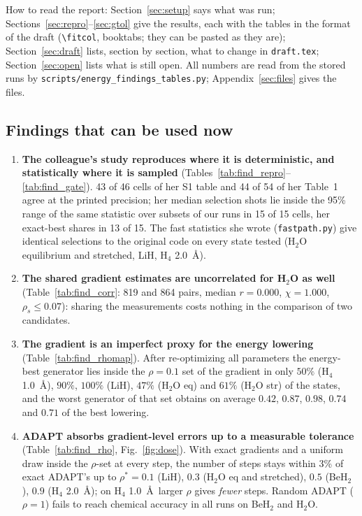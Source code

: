 \documentclass[11pt]{article}
\newcommand{\fitcol}[1]{\sbox{\fitbox}{#1}\ifdim\wd\fitbox>\columnwidth\resizebox{\columnwidth}{!}{\usebox{\fitbox}}\else\usebox{\fitbox}\fi}
\begin{document}
How to read the report: Section~\ref{sec:setup} says what was run; Sections~\ref{sec:repro}--\ref{sec:gtol} give the results, each with the tables in the format of the draft
(\verb|\fitcol|, booktabs; they can be pasted as they are); Section~\ref{sec:draft} lists, section by section, what to change in \texttt{draft.tex}; Section~\ref{sec:open} lists what is
still open. All numbers are read from the stored runs by \texttt{scripts/energy\_findings\_tables.py}; Appendix~\ref{sec:files} gives the files.

\subsection{Findings that can be used now}
\begin{enumerate}
  \item \textbf{The colleague's study reproduces where it is deterministic, and statistically where it is sampled} (Tables~\ref{tab:find_repro}--\ref{tab:find_gate}). 43 of 46 cells of her S1 table and 44 of 54 of her Table~1 agree at the printed precision;
        her median selection shots lie inside the 95\% range of the same statistic over subsets of our runs in 15 of 15 cells, her exact-best shares in 13 of 15. The fast statistics she wrote (\texttt{fastpath.py}) give
        identical selections to the original code on every state tested (H$_2$O equilibrium and stretched, LiH, H$_4$ 2.0~\AA).
  \item \textbf{The shared gradient estimates are uncorrelated for H$_2$O as well} (Table~\ref{tab:find_corr}: 819 and 864 pairs, median $r=0.000$, $\chi=1.000$, $\rho_s\le0.07$): sharing the measurements costs nothing in the comparison of two candidates.
  \item \textbf{The gradient is an imperfect proxy for the energy lowering} (Table~\ref{tab:find_rhomap}). After re-optimizing all parameters the energy-best generator lies inside the $\rho=0.1$ set of the gradient in only $50\%$ (H$_4$ 1.0~\AA), $90\%$,
        $100\%$ (LiH), $47\%$ (H$_2$O eq) and $61\%$ (H$_2$O str) of the states, and the worst generator of that set obtains on average $0.42$, $0.87$, $0.98$, $0.74$ and $0.71$ of the best lowering.
  \item \textbf{ADAPT absorbs gradient-level errors up to a measurable tolerance} (Table~\ref{tab:find_rho}, Fig.~\ref{fig:dose}). With exact gradients and a uniform draw inside the $\rho$-set at every step, the number of steps stays within 3\% of exact ADAPT's up to
        $\rho^\ast=0.1$ (LiH), $0.3$ (H$_2$O eq and stretched), $0.5$ (BeH$_2$), $0.9$ (H$_4$ 2.0~\AA); on H$_4$ 1.0~\AA\ larger $\rho$ gives \emph{fewer} steps. Random ADAPT ($\rho=1$) fails to reach chemical accuracy in all runs on BeH$_2$ and H$_2$O.

\end{enumerate}
\end{document}
